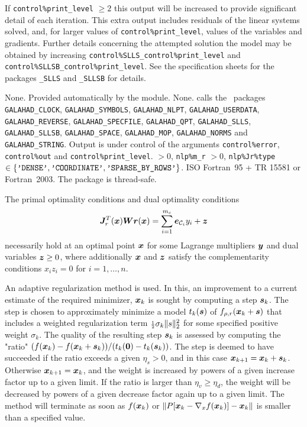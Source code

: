 \documentclass{galahad}
\newcommand{\packagename}{SNLS}
\begin{document}
If {\tt control\%print\_level} $\geq 2$ this
output will be increased to provide significant detail of each iteration.
This extra output includes residuals of the linear systems solved, and,
for larger values of {\tt control\%print\_level}, values of the variables
and gradients. Further details concerning the attempted solution the model
may be obtained by increasing
{\tt control\%SLLS\_control\%print\_level}
and
{\tt control\%SLLSB\_control\%print\_level}.
See the specification sheets for the packages
{\tt \libraryname\_SLLS} and {\tt \libraryname\_SLLSB}
for details.


\galgeneral

\galcommon None.
\galworkspace Provided automatically by the module.
\galroutines None.
\galmodules {\tt \packagename\_solve} calls the \galahad\ packages
{\tt GALAHAD\_CLOCK},
{\tt GALAHAD\_SY\-M\-BOLS},
{\tt GALA\-HAD\-\_NLPT},
{\tt GALAHAD\_USERDATA},
{\tt GALAHAD\_REVERSE},
{\tt GALAHAD\_SPECFILE},
{\tt GALAHAD\_QPT},
{\tt GALAHAD\_SLLS},
{\tt GALA\-HAD\_SLLSB},
{\tt GALAHAD\_\-SPACE},
{\tt GALAHAD\_MOP},
{\tt GALAHAD\_NORMS}
and
{\tt GALAHAD\_STRING}.
\galio Output is under control of the arguments
 {\tt control\%error}, {\tt control\%out} and
{\tt control\%print\_level}.
 $> 0$, {\tt nlp\%m\_r} $> 0$,
{\tt nlp\%Jr\%type} $\in \{
  \mbox{\tt 'DENSE'}, \mbox{\tt 'COORDINATE'}, \mbox{\tt 'SPARSE\_BY\_ROWS'}\}$.
\galportability ISO Fortran~95 + TR 15581 or Fortran~2003.
The package is thread-safe.


\galmethod
The primal optimality conditions  and dual optimality conditions
\[\bmJ_r^T(\bmx) \bmW \bmr(\bmx) = \sum_{i=1}^{m_c} \bme_{\calC_i} y_i + \bmz\]
necessarily hold at an optimal point ${\bm{x}}$ for some Lagrange multipliers 
${\bm{y}}$ and dual variables ${\bm{z}} \geq 0$, where additionally ${\bm{x}}$ and ${\bm{z}}$ 
satisfy the complementarity conditions $x_i z_i = 0$ for $i=1,\ldots,n$.

An adaptive regularization method is used.
In this, an improvement to a current
estimate of the required minimizer, ${\bm{x}}_k$ is sought by computing a
step ${\bm{s}}_k$. The step is chosen to approximately minimize a model $t_k({\bm{s}})$
of $f_{\rho,r}({\bm{x}}_k+{\bm{s}})$ that includes a weighted regularization term
${\scriptstyle \frac{1}{2}} \sigma_k \|s\|_2^2$
for some specified positive weight $\sigma_k$. The quality of the
resulting step ${\bm{s}}_k$ is assessed by computing the "ratio"
$(f({\bm{x}}_k) - f({\bm{x}}_k + {\bm{s}}_k))/(t_k({\bm{0}}) - t_k({\bm{s}}_k))$.
The step is deemed to have succeeded if the ratio exceeds a given $\eta_s > 0$,
and in this case ${\bm{x}}_{k+1} = {\bm{x}}_k + {\bm{s}}_k$. Otherwise
${\bm{x}}_{k+1} = {\bm{x}}_k$, and the weight is increased by powers of a given
increase factor up to a given limit. If the ratio is larger than
$\eta_v \geq \eta_d$, the weight will be decreased by powers of a given
decrease factor again up to a given limit. The method will terminate
as soon as $f({\bm{x}}_k)$ or
$\|P[{\bm{x}}_k - \nabla_x f({\bm{x}}_k)]-{\bm{x}}_k\|$ is smaller than a specified value.
\end{document}
